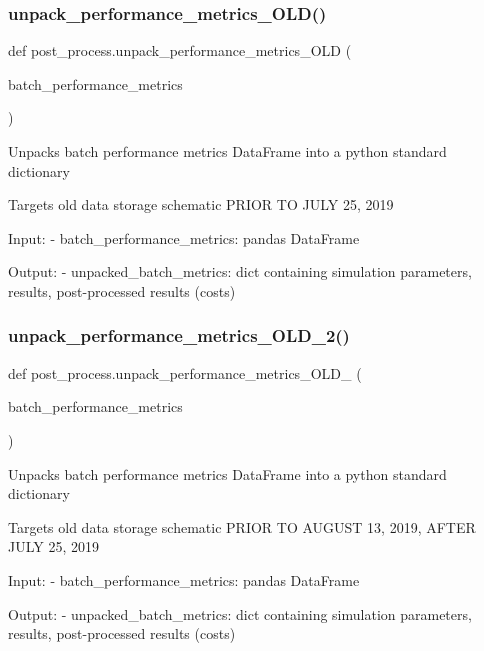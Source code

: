 \subsubsection{\texorpdfstring{unpack\_performance\_metrics\_OLD()}{unpack\_performance\_metrics\_OLD()}}
{\footnotesize\ttfamily def post\+\_\+process.\+unpack\+\_\+performance\+\_\+metrics\+\_\+\+O\+LD (\begin{DoxyParamCaption}\item[{}]{batch\+\_\+performance\+\_\+metrics }\end{DoxyParamCaption})}

\begin{DoxyVerb}Unpacks batch performance metrics DataFrame into a python standard dictionary

Targets old data storage schematic PRIOR TO JULY 25, 2019

Input:
- batch_performance_metrics:           pandas DataFrame

Output:
- unpacked_batch_metrics:              dict containing simulation parameters, results, post-processed results (costs)\end{DoxyVerb}
 \mbox{\label{namespacepost__process_a5b5b5271b7f2487e85d72afcc40903e7}} 
\subsubsection{\texorpdfstring{unpack\_performance\_metrics\_OLD\_2()}{unpack\_performance\_metrics\_OLD\_2()}}
{\footnotesize\ttfamily def post\+\_\+process.\+unpack\+\_\+performance\+\_\+metrics\+\_\+\+O\+L\+D\+\_ (\begin{DoxyParamCaption}\item[{}]{batch\+\_\+performance\+\_\+metrics }\end{DoxyParamCaption})}

\begin{DoxyVerb}Unpacks batch performance metrics DataFrame into a python standard dictionary

Targets old data storage schematic PRIOR TO AUGUST 13, 2019, AFTER JULY 25, 2019

Input:
- batch_performance_metrics:           pandas DataFrame

Output:
- unpacked_batch_metrics:              dict containing simulation parameters, results, post-processed results (costs)\end{DoxyVerb}
 
